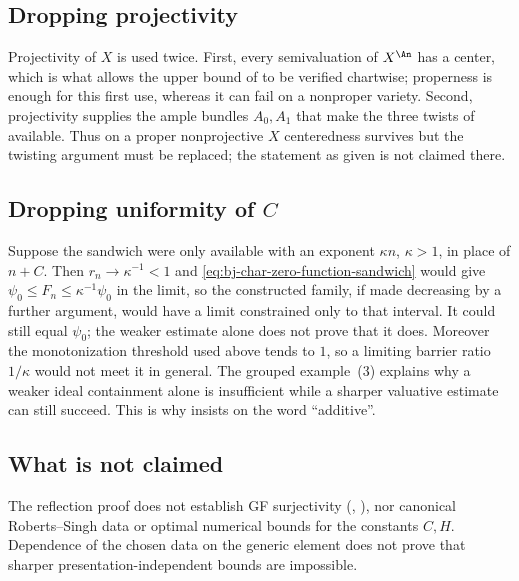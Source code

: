 \subsection{Dropping projectivity}
\label{sec:ch44-failure-projective}

Projectivity of $X$ is used twice.  First, every semivaluation of
$X^{\An}$ has a center, which is what allows the upper bound of
 to be verified chartwise; properness is
enough for this first use, whereas it can fail on a nonproper variety.
Second, projectivity supplies the ample bundles $A_0,A_1$ that make the
three twists of  available.  Thus on a proper
nonprojective $X$ centeredness survives but the twisting argument must be
replaced; the statement as given is not claimed there.

\subsection{Dropping uniformity of \texorpdfstring{$C$}{C}}
\label{sec:ch44-failure-uniform}

Suppose the sandwich were only available with an exponent $\kappa n$,
$\kappa>1$, in place of $n+C$.  Then $r_n\to\kappa^{-1}<1$ and
\eqref{eq:bj-char-zero-function-sandwich} would give
$\psi_0\le F_n\le\kappa^{-1}\psi_0$ in the limit, so the constructed
family, if made decreasing by a further argument, would have a limit
constrained only to that interval.  It could still equal $\psi_0$;
the weaker estimate alone does not prove that it does.  Moreover the monotonization threshold used above tends to $1$,
so a limiting barrier ratio $1/\kappa$ would not meet it in general.
The grouped example \,(3) explains why
a weaker ideal containment alone is insufficient while a sharper
valuative estimate can still succeed.  This is why
 insists on the word ``additive''.

\subsection{What is not claimed}
\label{sec:ch44-failure-notclaimed}

The reflection proof does not establish GF surjectivity
(, ),
nor canonical Roberts--Singh data or optimal numerical bounds for the
constants $C,H$.  Dependence of the chosen data on the generic element
does not prove that sharper presentation-independent bounds are impossible.

